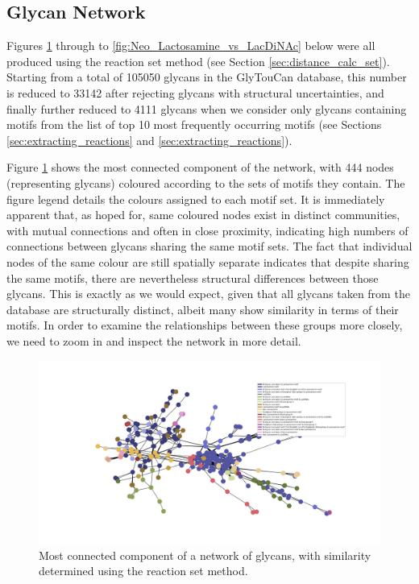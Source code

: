 \documentclass[12pt,a4paper]{article}
\begin{document}
\subsection{Glycan Network}
\label{sec:glycan_network}

Figures \ref{fig:threshold_87_conn_comp_1_method_set} through to \ref{fig:Neo_Lactosamine_vs_LacDiNAc} below were all produced using the reaction set method (see Section \ref{sec:distance_calc_set}). Starting from a total of 105050 glycans in the GlyTouCan database, this number is reduced to 33142 after rejecting glycans with structural uncertainties, and finally further reduced to 4111 glycans when we consider only glycans containing motifs from the list of top 10 most frequently occurring motifs (see Sections \ref{sec:extracting_reactions} and \ref{sec:extracting_reactions}).

Figure \ref{fig:threshold_87_conn_comp_1_method_set} shows the most connected component of the network, with 444 nodes (representing glycans) coloured according to the sets of motifs they contain. The figure legend details the colours assigned to each motif set. It is immediately apparent that, as hoped for, same coloured nodes exist in distinct communities, with mutual connections and often in close proximity, indicating high numbers of connections between glycans sharing the same motif sets. The fact that individual nodes of the same colour are still spatially separate indicates that despite sharing the same motifs, there are nevertheless structural differences between those glycans. This is exactly as we would expect, given that all glycans taken from the database are structurally distinct, albeit many show similarity in terms of their motifs. In order to examine the relationships between these groups more closely, we need to zoom in and inspect the network in more detail.

\begin{figure}
\centering 
\includegraphics[scale=0.5]{threshold_87_conn_comp_1_method_set/threshold_87_conn_comp_1_method_set.pdf} 
\caption{Most connected component of a network of glycans, with similarity determined using the reaction set method.}
\label{fig:threshold_87_conn_comp_1_method_set}
\end{figure}
\clearpage
\end{document}
